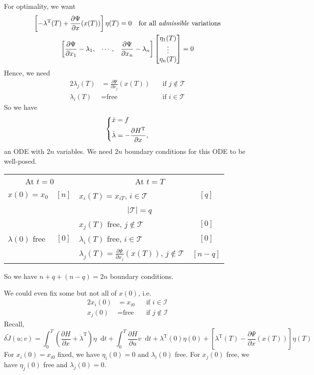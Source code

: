 \documentclass[letterpaper,12pt,titlepage]{report}
\newcommand*\dif{\mathop{}\!\mathrm{d}}
\newcommand{\trans}{^\text{T}}
\newcommand*\pder[2]{\frac{\partial #1}{\partial #2}}
\theoremstyle{plain}
\theoremstyle{definition}
\begin{document}
For optimality, we want
\begin{gather}
  \left[ -\lambda\trans(T) + \pder{\Psi}{x}(x(T)) \right] \eta(T) = 0 \quad \text{for all \emph{admissible} variations} \\
  \begin{bmatrix}
    \displaystyle \pder{\Psi}{x_1}-\lambda_1, & \cdots, & \displaystyle \pder{\Psi}{x_n}-\lambda_n
  \end{bmatrix}
  \begin{bmatrix}
    \eta_1(T) \\
    \vdots \\
    \eta_n(T)
  \end{bmatrix} = 0
\end{gather}
Hence, we need
\begin{alignat}{2}
  \lambda_j(T) &= \pder{\Psi}{x_j}(x(T)) \quad & \text{if } j\not\in\mathcal T \\
  \lambda_i(T) &= \text{free} & \text{if } i\in\mathcal T
\end{alignat}
So we have
\[ \begin{dcases}
    \dot x = f \\
    \dot\lambda = -\pder{H\trans}{x},
  \end{dcases} \]
an ODE with $2n$ variables. We need $2n$ boundary conditions for this ODE to be well-posed.
\begin{center}
  \begin{tabular}{lclc}
    \toprule
    \multicolumn{2}{c}{At $t=0$} & \multicolumn{2}{c}{At $t=T$} \\
    \cmidrule(r){1-2} \cmidrule(l){3-4}
    $x(0)=x_0$ & $[n]$ & $x_i(T)=x_{iT}$, $i\in\mathcal T$ & $[q]$ \\
                                 && $\phantom{x_i(T)=x_{iT}}$ $|\mathcal T|=q$ \\
                                 && $x_j(T)$ free, $j\not\in\mathcal T$ & $[0]$ \\
    $\lambda(0)$ free & $[0]$ & $\lambda_i(T)$ free, $i\in\mathcal T$ & $[0]$ \\
                                 && $\lambda_j(T)=\displaystyle\pder{\Psi}{x_j}(x(T))$, $j\not\in\mathcal T$ & $[n-q]$ \\
    \bottomrule
  \end{tabular}
\end{center}
So we have $n+q+(n-q)=2n$ boundary conditions.

We could even fix some but not all of $x(0)$, i.e.
\begin{alignat}{2}
  x_i(0) &= x_{i0} & \text{if } i\in\mathcal I \\
  x_j(0) &= \text{free} \quad & \text{if } j\not\in\mathcal I
\end{alignat}
Recall,
\[
  \delta\tilde J(u;v) = \int_0^T\! \left(\pder{H}{x} + \dot\lambda\trans \right)\eta\dif t + \int_0^T\! \pder{H}{u} v \dif t + \lambda\trans(0)\eta(0) + \left[\lambda\trans(T)-\pder{\Psi}{x}(x(T))\right] \eta(T)
\]
For $x_i(0)=x_{i0}$ fixed, we have $\eta_i(0)=0$ and $\lambda_i(0)$ free. For $x_j(0)$ free, we have $\eta_j(0)$ free and $\lambda_j(0)=0$.
\end{document}
